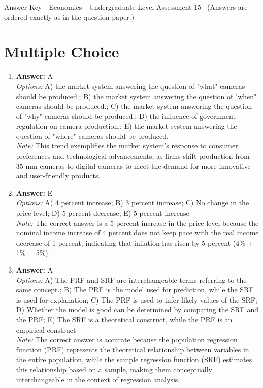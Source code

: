 \documentclass[12pt]{article}
\begin{document}
\begin{center}
Answer Key - Economics - Undergraduate Level Assessment 15 \
\small (Answers are ordered exactly as in the question paper.)
\end{center}

\section*{Multiple Choice}
\begin{enumerate}[label=\arabic*.]
\item \textbf{Answer:} A
\\ \textit{Options:} A) the market system answering the question of "what" cameras should be produced.; B) the market system answering the question of "when" cameras should be produced.; C) the market system answering the question of "why" cameras should be produced.; D) the influence of government regulation on camera production.; E) the market system answering the question of "where" cameras should be produced.
\\ \textit{Note:} This trend exemplifies the market system's response to consumer preferences and technological advancements, as firms shift production from 35-mm cameras to digital cameras to meet the demand for more innovative and user-friendly products.
\item \textbf{Answer:} E
\\ \textit{Options:} A) 4 percent increase; B) 3 percent increase; C) No change in the price level; D) 5 percent decrease; E) 5 percent increase
\\ \textit{Note:} The correct answer is a 5 percent increase in the price level because the nominal income increase of 4 percent does not keep pace with the real income decrease of 1 percent, indicating that inflation has risen by 5 percent (4\% + 1\% = 5\%).
\item \textbf{Answer:} A
\\ \textit{Options:} A) The PRF and SRF are interchangeable terms referring to the same concept.; B) The PRF is the model used for prediction, while the SRF is used for explanation; C) The PRF is used to infer likely values of the SRF; D) Whether the model is good can be determined by comparing the SRF and the PRF; E) The SRF is a theoretical construct, while the PRF is an empirical construct
\\ \textit{Note:} The correct answer is accurate because the population regression function (PRF) represents the theoretical relationship between variables in the entire population, while the sample regression function (SRF) estimates this relationship based on a sample, making them conceptually interchangeable in the context of regression analysis.

\end{enumerate}
\end{document}
